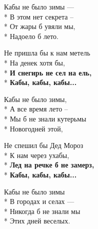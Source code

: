\medskip

\begin{minipage}{\linewidth}
Кабы не было зимы —\\*
В этом нет секрета –\\*
От жары б увяли мы,\\*
Надоело б лето.\\
\end{minipage}\par\medskip\nobreak

\medskip

\begin{minipage}{\linewidth}
Не пришла бы к нам метель\\*
На денек хотя бы,\\*
\textbf{И снегирь не сел на ель,}\\*
\textbf{Кабы, кабы, кабы...}\\
\end{minipage}\par\medskip\nobreak

\medskip

\begin{minipage}{\linewidth}
Кабы не было зимы,\\*
А все время лето –\\*
Мы б не знали кутерьмы\\*
Новогодней этой,\\
\end{minipage}\par\medskip\nobreak

\medskip

\begin{minipage}{\linewidth}
Не спешил бы Дед Мороз\\*
К нам через ухабы,\\*
\textbf{Лед на речке б не замерз,}\\*
\textbf{Кабы, кабы, кабы...}\\
\end{minipage}\par\medskip\nobreak

\medskip

\begin{minipage}{\linewidth}
Кабы не было зимы\\*
В городах и селах —\\*
Никогда б не знали мы\\*
Этих дней веселых.\\
\end{minipage}

